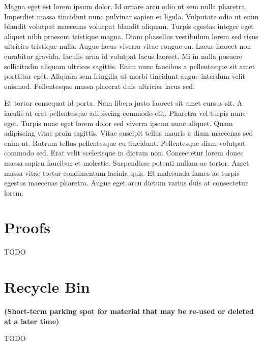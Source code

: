 \documentclass[12pt]{article}
\begin{document}
Magna eget est lorem ipsum dolor. Id ornare arcu odio ut sem nulla pharetra.
Imperdiet massa tincidunt nunc pulvinar sapien et ligula. Vulputate odio ut
enim blandit volutpat maecenas volutpat blandit aliquam. Turpis egestas
integer eget aliquet nibh praesent tristique magna. Diam phasellus vestibulum
lorem sed risus ultricies tristique nulla. Augue lacus viverra vitae congue
eu. Lacus laoreet non curabitur gravida. Iaculis urna id volutpat lacus
laoreet. Mi in nulla posuere sollicitudin aliquam ultrices sagittis. Enim
nunc faucibus a pellentesque sit amet porttitor eget. Aliquam sem fringilla
ut morbi tincidunt augue interdum velit euismod. Pellentesque massa placerat
duis ultricies lacus sed.

Et tortor consequat id porta. Nam libero justo laoreet sit amet cursus sit. A
iaculis at erat pellentesque adipiscing commodo elit. Pharetra vel turpis
nunc eget. Turpis nunc eget lorem dolor sed viverra ipsum nunc aliquet. Quam
adipiscing vitae proin sagittis. Vitae suscipit tellus mauris a diam maecenas
sed enim ut. Rutrum tellus pellentesque eu tincidunt. Pellentesque diam
volutpat commodo sed. Erat velit scelerisque in dictum non. Consectetur lorem
donec massa sapien faucibus et molestie. Suspendisse potenti nullam ac
tortor. Amet massa vitae tortor condimentum lacinia quis. Et malesuada fames
ac turpis egestas maecenas pharetra. Augue eget arcu dictum varius duis at
consectetur lorem.

\newpage

% 

\newpage
\begin{appendices}
\section{Proofs}

TODO



\section{Recycle Bin}
{\textbf{(Short-term parking spot for material that may be re-used or deleted at a later time)}}


TODO

\end{appendices}
\end{document}
